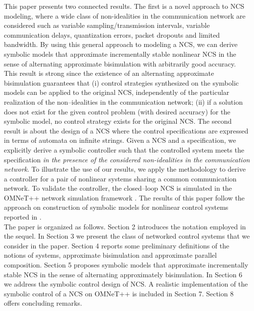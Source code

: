 \documentclass{amsart}
\begin{document}
This paper presents two connected results. The first is a novel approach to NCS modeling, where a wide class of non-idealities in the communication network are considered such as variable sampling/transmission intervals, variable communication delays, quantization errors, packet dropouts and limited bandwidth. By using this general approach to modeling a NCS, we can derive symbolic models that approximate incrementally stable \cite{IncrementalS} nonlinear NCS in the sense of alternating approximate bisimulation \cite{PolaSIAM2009} with arbitrarily good accuracy. This result is strong since the existence of an alternating approximate bisimulation guarantees that (i) control strategies synthesized on the symbolic models can be applied to the original NCS, independently of the particular realization of the non--idealities in the communication network; (ii) if a solution does not exist for the given control problem (with desired accuracy) for the symbolic model, no control strategy exists for the original NCS. 
The second result is about the design of a NCS where the control specifications are expressed in terms of automata on infinite strings. Given a NCS and a specification, we explicitly derive a symbolic controller such that the controlled system meets the specification \emph{in the presence of the considered non-idealities in the communication network}. To illustrate the use of our results, we apply the methodology to derive a controller for a pair of nonlinear systems sharing a common communication network. To validate the controller, the closed--loop NCS is simulated in the OMNeT++ network simulation framework \cite{Omnet}. The results of this paper follow the approach on construction of symbolic models for nonlinear control systems reported in \cite{PolaAutom2008,PolaSIAM2009,PolaSCL10,PolaTAC12,MajidTAC11}. \\
The paper is organized as follows. Section 2 introduces the notation employed in the sequel. In Section 3 we present the class of networked control systems that we consider in the paper. Section 4 reports some preliminary definitions of the notions of systems, approximate bisimulation and approximate parallel composition. Section 5 proposes symbolic models that approximate incrementally stable NCS in the sense of alternating approximately bisimulation. In Section 6 we address the symbolic control design of NCS. A realistic implementation of the symbolic control of a NCS on \mbox{OMNeT++} is included in Section 7. Section 8 offers concluding remarks.
\end{document}
